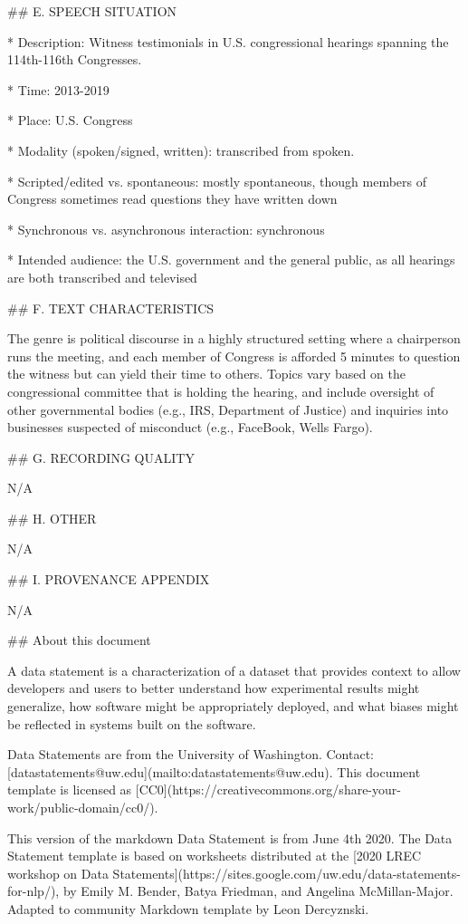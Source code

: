 \#\# E. SPEECH SITUATION

* Description: Witness testimonials in U.S. congressional hearings spanning the 114th-116th Congresses.

* Time: 2013-2019

* Place: U.S. Congress

* Modality (spoken/signed, written): transcribed from spoken.

* Scripted/edited vs. spontaneous: mostly spontaneous, though members of Congress sometimes read questions they have written down

* Synchronous vs. asynchronous interaction: synchronous

* Intended audience:  the U.S. government and the general public, as all hearings are both transcribed and televised

\#\# F. TEXT CHARACTERISTICS

The genre is political discourse in a highly structured setting where a chairperson runs the meeting, and each member of Congress is afforded 5 minutes to question the witness but can yield their time to others. Topics vary based on the congressional committee that is holding the hearing, and include oversight of other governmental bodies (e.g., IRS, Department of Justice) and inquiries into businesses suspected of misconduct (e.g., FaceBook, Wells Fargo).

\#\# G. RECORDING QUALITY

N/A

\#\# H. OTHER

N/A

\#\# I. PROVENANCE APPENDIX

N/A

\#\# About this document

A data statement is a characterization of a dataset that provides context to allow developers and users to better understand how experimental results might generalize, how software might be appropriately deployed, and what biases might be reflected in systems built on the software.

Data Statements are from the University of Washington. Contact: [datastatements@uw.edu](mailto:datastatements@uw.edu). This document template is licensed as [CC0](https://creativecommons.org/share-your-work/public-domain/cc0/).

This version of the markdown Data Statement is from June 4th 2020. The Data Statement template is based on worksheets distributed at the [2020 LREC workshop on Data Statements](https://sites.google.com/uw.edu/data-statements-for-nlp/), by Emily M. Bender, Batya Friedman, and Angelina McMillan-Major. Adapted to community Markdown template by Leon Dercyznski.


